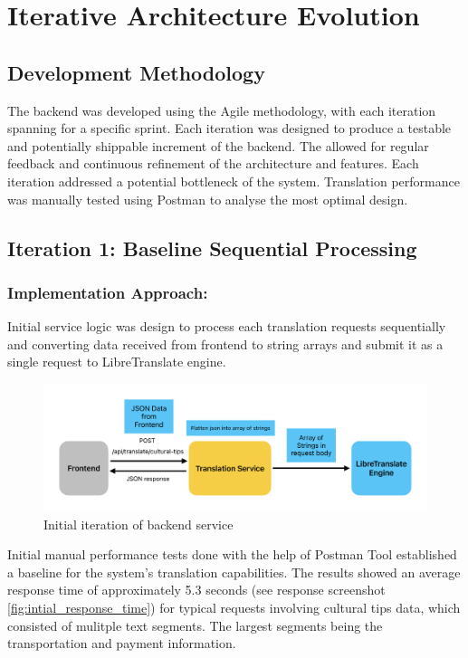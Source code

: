 \section{Iterative Architecture Evolution}

\subsection{Development Methodology}

The backend was developed using the Agile methodology, with each iteration spanning for a specific sprint. Each iteration was designed to produce a testable and potentially shippable increment of the backend. The allowed for regular feedback and continuous refinement of the architecture and features. Each iteration addressed a potential bottleneck of the system. Translation performance was manually tested using Postman\cite{postman2025} to analyse the most optimal design.

\subsection{Iteration 1: Baseline Sequential Processing}

\subsubsection{Implementation Approach:} Initial service logic was design to process each translation requests sequentially and converting data received from frontend to string arrays and submit it as a single request to LibreTranslate engine.

\begin{figure}[H]
    \centering
    \includegraphics[width=1\linewidth]{chapter/05_implementation/backend/B_architectural_design/Backend_Initial_Concept.pdf}
    \caption{Initial iteration of backend service}
    \label{fig:backend_iteration_1}
\end{figure}

Initial manual performance tests done with the help of Postman Tool\cite{postman2025} established a baseline for the system's translation capabilities. The results showed an average response time of approximately 5.3 seconds (see response screenshot \ref{fig:intial_response_time}) for typical requests involving cultural tips data, which consisted of mulitple text segments. The largest segments being the transportation and payment information.


